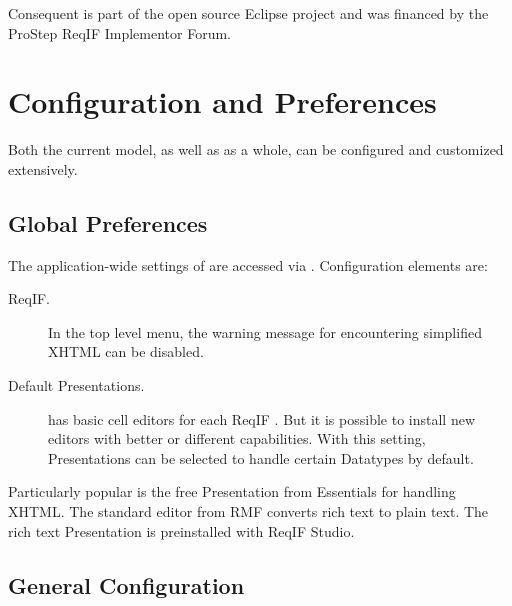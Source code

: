 Consequent is part of the open source Eclipse project and was financed by the ProStep ReqIF Implementor Forum.

\section{Configuration and Preferences}

Both the current model, as well as \pror{} as a whole, can be configured and customized extensively.

\subsection{Global Preferences}

The application-wide settings of \pror{} are accessed via .  Configuration elements are:

\begin{description}
\item[ReqIF.] In the top level menu, the warning message for encountering simplified XHTML can be disabled.
\item[Default Presentations.] \pror{} has basic cell editors for each ReqIF .  But it is possible to install new editors with better or different capabilities.  With this setting, Presentations can be selected to handle certain Datatypes by default.
\end{description}

\begin{info}
Particularly popular is the free Presentation from Essentials for handling XHTML.  The standard editor from RMF converts rich text to plain text.  The rich text Presentation is preinstalled with ReqIF Studio.
\end{info}

\subsection{General Configuration}
\label{sec:general_configuration}


